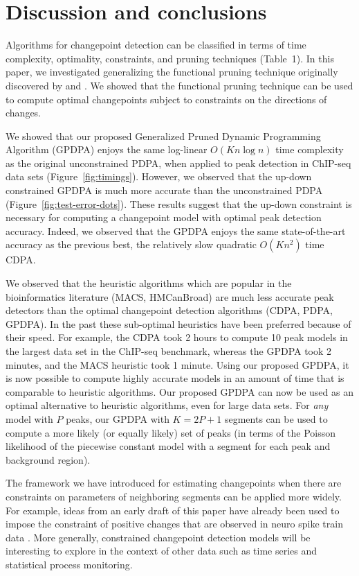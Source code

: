 \documentclass[aoas]{imsart}
\begin{document}
\section{Discussion and conclusions}
\label{sec:discussion}

Algorithms for changepoint detection can be classified in terms of
time complexity, optimality, constraints, and pruning techniques
(Table~1). In this paper, we investigated generalizing the functional
pruning technique originally discovered by \citet{pruned-dp} and
\citet{phd-johnson}. We showed that the functional pruning technique can
be used to compute optimal changepoints subject to constraints
on the directions of changes.

We showed that our proposed Generalized Pruned Dynamic Programming
Algorithm (GPDPA) enjoys the same log-linear $O(Kn\log n)$ time
complexity as the original unconstrained PDPA, when applied to peak
detection in ChIP-seq data sets (Figure~\ref{fig:timings}). However,
we observed that the up-down constrained GPDPA is much more accurate
than the unconstrained PDPA (Figure~\ref{fig:test-error-dots}). These
results suggest that the up-down constraint is necessary for computing
a changepoint model with optimal peak detection accuracy. Indeed, we
observed that the GPDPA enjoys the same state-of-the-art accuracy as
the previous best, the relatively slow quadratic $O(Kn^2)$ time
CDPA.

We observed that the heuristic algorithms which are popular in the
bioinformatics literature (MACS, HMCanBroad) are much less accurate peak detectors
than the optimal changepoint detection algorithms (CDPA, PDPA,
GPDPA). In the past these sub-optimal heuristics have been preferred
because of their speed. For example, the CDPA took 2 hours to compute
10 peak models in the largest data set in the ChIP-seq benchmark,
whereas the GPDPA took 2 minutes, and the MACS heuristic took 1
minute. Using our proposed GPDPA, it is now possible to compute highly
accurate models in an amount of time that is comparable to heuristic
algorithms. Our proposed GPDPA can now be used as an optimal
alternative to heuristic algorithms, even for large data sets. 
For \emph{any} model with $P$ peaks, our GPDPA with $K=2P+1$ segments can be used to compute 
a more likely (or equally likely) set of peaks (in terms of the Poisson likelihood 
of the piecewise constant model with a segment for each peak and background region).

The framework we have introduced for estimating changepoints when
there are constraints on parameters of neighboring segments can be
applied more widely. For example, ideas from an early draft of this
paper \citep{Hocking-constrained-changepoint-detection} have already
been used to impose the constraint of positive changes that are
observed in neuro spike train data \citep{Jewell2018}. More generally,
constrained changepoint detection models will be interesting to
explore in the context of other data such as time series and
statistical process monitoring.
 
\end{document}
